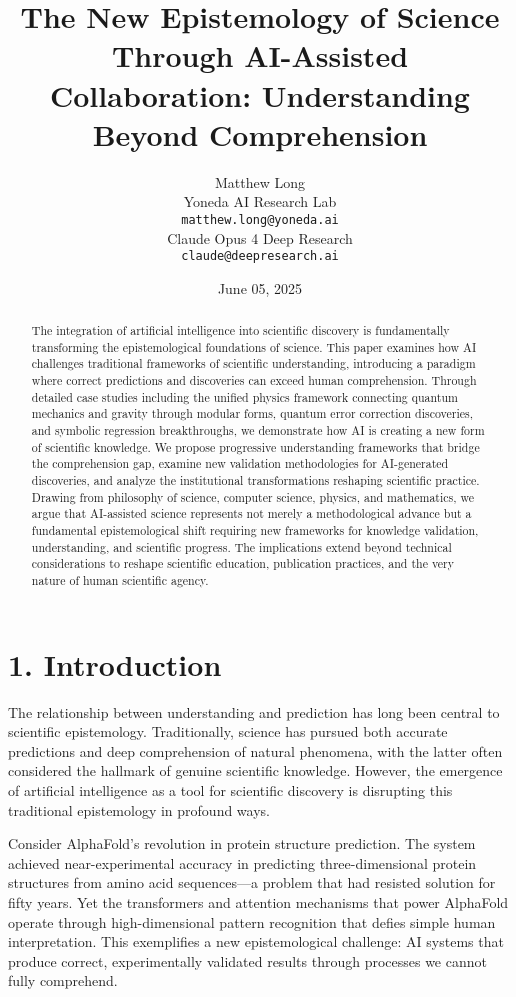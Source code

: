 \documentclass{article}
\title{The New Epistemology of Science Through AI-Assisted Collaboration: Understanding Beyond Comprehension}
\author{
  Matthew Long \\
  Yoneda AI Research Lab \\
  \texttt{matthew.long@yoneda.ai} \\
  \And
  Claude Opus 4 Deep Research \\
  \texttt{claude@deepresearch.ai} \\
}
\date{June 05, 2025}
\begin{document}
\maketitle

\begin{abstract}
The integration of artificial intelligence into scientific discovery is fundamentally transforming the epistemological foundations of science. This paper examines how AI challenges traditional frameworks of scientific understanding, introducing a paradigm where correct predictions and discoveries can exceed human comprehension. Through detailed case studies including the unified physics framework connecting quantum mechanics and gravity through modular forms, quantum error correction discoveries, and symbolic regression breakthroughs, we demonstrate how AI is creating a new form of scientific knowledge. We propose progressive understanding frameworks that bridge the comprehension gap, examine new validation methodologies for AI-generated discoveries, and analyze the institutional transformations reshaping scientific practice. Drawing from philosophy of science, computer science, physics, and mathematics, we argue that AI-assisted science represents not merely a methodological advance but a fundamental epistemological shift requiring new frameworks for knowledge validation, understanding, and scientific progress. The implications extend beyond technical considerations to reshape scientific education, publication practices, and the very nature of human scientific agency.
\end{abstract}

\section{1. Introduction}

The relationship between understanding and prediction has long been central to scientific epistemology. Traditionally, science has pursued both accurate predictions and deep comprehension of natural phenomena, with the latter often considered the hallmark of genuine scientific knowledge. However, the emergence of artificial intelligence as a tool for scientific discovery is disrupting this traditional epistemology in profound ways.


Consider AlphaFold's revolution in protein structure prediction. The system achieved near-experimental accuracy in predicting three-dimensional protein structures from amino acid sequences—a problem that had resisted solution for fifty years. Yet the transformers and attention mechanisms that power AlphaFold operate through high-dimensional pattern recognition that defies simple human interpretation. This exemplifies a new epistemological challenge: AI systems that produce correct, experimentally validated results through processes we cannot fully comprehend.
\end{document}
